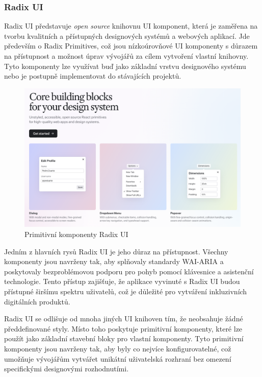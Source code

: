 \clearpage

\subsubsection{Radix UI}
Radix UI představuje \emph{open source} knihovnu UI komponent, která je zaměřena na tvorbu kvalitních a přístupných designových systémů a webových aplikací.
Jde především o Radix Primitives, což jsou nízkoúrovňové UI komponenty s důrazem na přístupnost a možnost úprav vývojářů za cílem vytvoření vlastní knihovny.
Tyto komponenty lze využívat buď jako základní vrstvu designového systému nebo je postupně implementovat do stávajících projektů. \cite{RadixUIPrimitives}

\begin{figure}[H]
    \includegraphics[width=\textwidth]{images/radix-ui}
    \caption{Primitivní komponenty Radix UI} \label{picture:radix-ui}
\end{figure}

Jedním z hlavních rysů Radix UI je jeho důraz na přístupnost. Všechny komponenty jsou navrženy tak, aby splňovaly standardy WAI-ARIA a poskytovaly bezproblémovou podporu pro pohyb pomocí klávesnice a asistenční technologie. Tento přístup zajišťuje, že aplikace vyvinuté s Radix UI budou přístupné širšímu spektru uživatelů, což je důležité pro vytváření inkluzivních digitálních produktů.

Radix UI se odlišuje od mnoha jiných UI knihoven tím, že neobsahuje žádné předdefinované styly. Místo toho poskytuje primitivní komponenty, které lze použít jako základní stavební bloky pro vlastní komponenty. Tyto primitivní komponenty jsou navrženy tak, aby byly co nejvíce konfigurovatelné, což umožňuje vývojářům vytvářet unikátní uživatelská rozhraní bez omezení specifickými designovými rozhodnutími.

